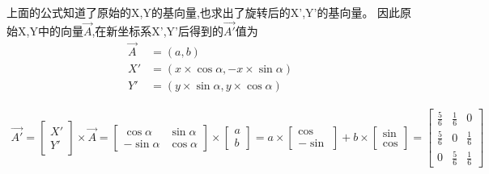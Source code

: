 上面的公式知道了原始的X,Y的基向量,也求出了旋转后的X',Y'的基向量。
因此原始X,Y中的向量$\overrightarrow{A}$,在新坐标系X',Y'后得到的$\overrightarrow{A'}$值为
	\begin{subequations}
		\begin{align}
			\overrightarrow{A} & = (a, b) \\
			X' & =(x \times \cos \alpha, -x \times \sin \alpha) \\
			Y' & =(y \times \sin \alpha, y \times \cos \alpha)
		\end{align}
	\end{subequations}

	\begin{subequations}
		\begin{align}
		\overrightarrow{A'} = \begin{bmatrix}X' \\ Y'\end{bmatrix} \times \overrightarrow{A}
		 = \begin{bmatrix} 
			\cos \alpha & \sin \alpha \\
			- \sin \alpha & \cos \alpha
		 \end{bmatrix} \times \begin{bmatrix} a \\ b \end{bmatrix}   
		 = a \times \begin{bmatrix}  \cos \\ - \sin \end{bmatrix} + b \times \begin{bmatrix}  \sin \\ \cos \end{bmatrix} 
		 = \begin{bmatrix}
			\frac{5}{6} & \frac{1}{6} & 0
			\\[0.3em]
			\frac{5}{6} & 0
			& \frac{1}{6} \\[0.3em]
			0
						& \frac{5}{6} & \frac{1}{6}
	\end{bmatrix}
	\end{align}
  \end{subequations}